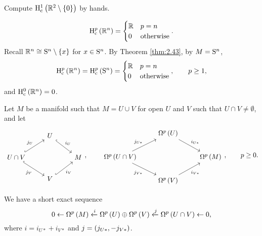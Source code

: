 \begin{exercise*}
Compute $ \H_\c^1\br{\RR^2 \setminus \cbr{0}} $ by hands.
\end{exercise*}

\begin{example}
$$ \H_\c^p\br{\RR^n} =
\begin{cases}
\RR & p = n \\
0 & \text{otherwise}
\end{cases}.
$$
Recall $ \RR^n \cong \S^n \setminus \cbr{x} $ for $ x \in \S^n $. By Theorem \ref{thm:2.43}, by $ M = \S^n $,
$$ \H_\c^p\br{\RR^n} = \H_\c^p\br{\S^n} =
\begin{cases}
\RR & p = n \\
0 & \text{otherwise}
\end{cases},
\qquad p \ge 1, $$
and $ \H_\c^0\br{\RR^n} = 0 $.
\end{example}


Let $ M $ be a manifold such that $ M = U \cup V $ for open $ U $ and $ V $ such that $ U \cap V \ne \emptyset $, and let
$$
\begin{tikzcd}
& U \arrow[hookrightarrow]{dr}{i_U} & \\
U \cap V \arrow[hookrightarrow]{ur}{j_U} \arrow[hookrightarrow, swap]{dr}{j_V} & & M \\
& V \arrow[hookrightarrow, swap]{ur}{i_V} &
\end{tikzcd},
\qquad
\begin{tikzcd}
& \Omega^p\br{U} \arrow{dr}{i_{U*}} & \\
\Omega^p\br{U \cap V} \arrow{ur}{j_{U*}} \arrow[swap]{dr}{j_{V*}} & & \Omega^p\br{M} \\
& \Omega^p\br{V} \arrow[swap]{ur}{i_{V*}} &
\end{tikzcd},
\qquad p \ge 0. $$

\begin{proposition}
We have a short exact sequence
$$ 0 \leftarrow \Omega^p\br{M} \xleftarrow{i} \Omega^p\br{U} \oplus \Omega^p\br{V} \xleftarrow{j} \Omega^p\br{U \cap V} \leftarrow 0, $$
where $ i = i_{U*} + i_{V*} $ and $ j = \br{j_{U*}, -j_{V*}} $.
\end{proposition}

